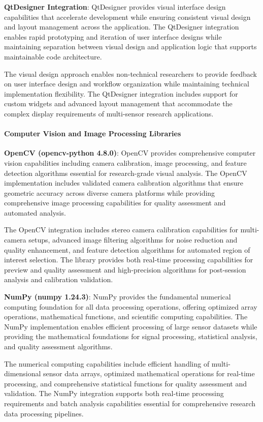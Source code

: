 \documentclass[11pt,a4paper]{report}
\begin{document}
\textbf{QtDesigner Integration}: QtDesigner provides visual interface design capabilities that accelerate development while
ensuring consistent visual design and layout management across the application. The QtDesigner integration enables rapid
prototyping and iteration of user interface designs while maintaining separation between visual design and application
logic that supports maintainable code architecture.

The visual design approach enables non-technical researchers to provide feedback on user interface design and workflow
organization while maintaining technical implementation flexibility. The QtDesigner integration includes support for
custom widgets and advanced layout management that accommodate the complex display requirements of multi-sensor research
applications.

\paragraph{Computer Vision and Image Processing Libraries}

\textbf{OpenCV (opencv-python 4.8.0)}: OpenCV provides comprehensive computer vision capabilities including camera
calibration, image processing, and feature detection algorithms essential for research-grade visual analysis. The OpenCV
implementation includes validated camera calibration algorithms that ensure geometric accuracy across diverse camera
platforms while providing comprehensive image processing capabilities for quality assessment and automated analysis.

The OpenCV integration includes stereo camera calibration capabilities for multi-camera setups, advanced image filtering
algorithms for noise reduction and quality enhancement, and feature detection algorithms for automated region of
interest selection. The library provides both real-time processing capabilities for preview and quality assessment and
high-precision algorithms for post-session analysis and calibration validation.

\textbf{NumPy (numpy 1.24.3)}: NumPy provides the fundamental numerical computing foundation for all data processing
operations, offering optimized array operations, mathematical functions, and scientific computing capabilities. The
NumPy implementation enables efficient processing of large sensor datasets while providing the mathematical foundations
for signal processing, statistical analysis, and quality assessment algorithms.

The numerical computing capabilities include efficient handling of multi-dimensional sensor data arrays, optimized
mathematical operations for real-time processing, and comprehensive statistical functions for quality assessment and
validation. The NumPy integration supports both real-time processing requirements and batch analysis capabilities
essential for comprehensive research data processing pipelines.
\end{document}
